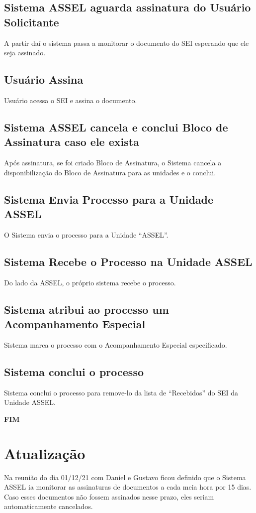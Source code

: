 \subsection{Sistema ASSEL aguarda assinatura do Usuário Solicitante}

A partir daí o sistema passa a monitorar o documento do SEI esperando que ele seja assinado.
	
\subsection{Usuário Assina}

Usuário acessa o SEI e assina o documento.


\subsection{Sistema ASSEL cancela e conclui Bloco de Assinatura caso ele exista}

Após assinatura, se foi criado Bloco de Assinatura, o Sistema cancela a disponibilização do Bloco de Assinatura para as unidades e o conclui.

\subsection{Sistema Envia Processo para a Unidade ASSEL}

O Sistema envia o processo para a Unidade ``ASSEL''.

\subsection{Sistema Recebe o Processo na Unidade ASSEL}

Do lado da ASSEL, o próprio sistema recebe o processo.

\subsection{Sistema atribui ao processo um Acompanhamento Especial}

Sistema marca o processo com o Acompanhamento Especial especificado.

\subsection{Sistema conclui o processo}

Sistema conclui o processo para remove-lo da lista de ``Recebidos'' do SEI da Unidade ASSEL.

\Large
\begin{center}
	\textbf{FIM}
\end{center}
\normalsize


\section{Atualização}

	Na reunião do dia 01/12/21 com Daniel e Gustavo ficou definido 	que o Sistema ASSEL ia monitorar as assinaturas de documentos a cada meia hora por 15 dias. Caso esses documentos não fossem assinados nesse prazo, eles seriam automaticamente cancelados.


